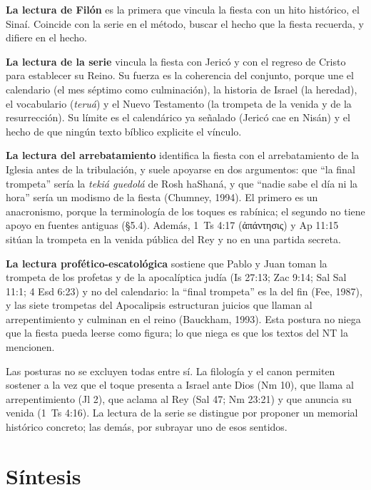 \documentclass[11pt,letterpaper]{article}
\newcommand{\grc}[1]{\foreignlanguage{ancientgreek}{#1}}
\begin{document}
\textbf{La lectura de Filón} es la primera que vincula la fiesta con un hito histórico, el Sinaí. Coincide con la serie en el método, buscar el hecho que la fiesta recuerda, y difiere en el hecho.

\textbf{La lectura de la serie} vincula la fiesta con Jericó y con el regreso de Cristo para establecer su Reino. Su fuerza es la coherencia del conjunto, porque une el calendario (el mes séptimo como culminación), la historia de Israel (la heredad), el vocabulario (\emph{teruá}) y el Nuevo Testamento (la trompeta de la venida y de la resurrección). Su límite es el calendárico ya señalado (Jericó cae en Nisán) y el hecho de que ningún texto bíblico explicite el vínculo.

\textbf{La lectura del arrebatamiento} identifica la fiesta con el arrebatamiento de la Iglesia antes de la tribulación, y suele apoyarse en dos argumentos: que ``la final trompeta'' sería la \emph{tekiá guedolá} de Rosh haShaná, y que ``nadie sabe el día ni la hora'' sería un modismo de la fiesta (Chumney, 1994). El primero es un anacronismo, porque la terminología de los toques es rabínica; el segundo no tiene apoyo en fuentes antiguas (§5.4). Además, 1~Ts 4:17 (\grc{ἀπάντησις}) y Ap 11:15 sitúan la trompeta en la venida pública del Rey y no en una partida secreta.

\textbf{La lectura profético-escatológica} sostiene que Pablo y Juan toman la trompeta de los profetas y de la apocalíptica judía (Is 27:13; Zac 9:14; Sal Sal 11:1; 4 Esd 6:23) y no del calendario: la ``final trompeta'' es la del fin (Fee, 1987), y las siete trompetas del Apocalipsis estructuran juicios que llaman al arrepentimiento y culminan en el reino (Bauckham, 1993). Esta postura no niega que la fiesta pueda leerse como figura; lo que niega es que los textos del NT la mencionen.

Las posturas no se excluyen todas entre sí. La filología y el canon permiten sostener a la vez que el toque presenta a Israel ante Dios (Nm 10), que llama al arrepentimiento (Jl 2), que aclama al Rey (Sal 47; Nm 23:21) y que anuncia su venida (1~Ts 4:16). La lectura de la serie se distingue por proponer un memorial histórico concreto; las demás, por subrayar uno de esos sentidos.

\section{Síntesis}
\end{document}
